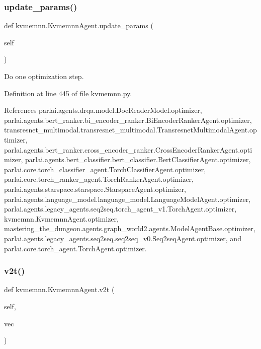\subsubsection{\texorpdfstring{update\+\_\+params()}{update\_params()}}
{\footnotesize\ttfamily def kvmemnn.\+Kvmemnn\+Agent.\+update\+\_\+params (\begin{DoxyParamCaption}\item[{}]{self }\end{DoxyParamCaption})}

\begin{DoxyVerb}Do one optimization step.\end{DoxyVerb}
 

Definition at line 445 of file kvmemnn.\+py.



References parlai.\+agents.\+drqa.\+model.\+Doc\+Reader\+Model.\+optimizer, parlai.\+agents.\+bert\+\_\+ranker.\+bi\+\_\+encoder\+\_\+ranker.\+Bi\+Encoder\+Ranker\+Agent.\+optimizer, transresnet\+\_\+multimodal.\+transresnet\+\_\+multimodal.\+Transresnet\+Multimodal\+Agent.\+optimizer, parlai.\+agents.\+bert\+\_\+ranker.\+cross\+\_\+encoder\+\_\+ranker.\+Cross\+Encoder\+Ranker\+Agent.\+optimizer, parlai.\+agents.\+bert\+\_\+classifier.\+bert\+\_\+classifier.\+Bert\+Classifier\+Agent.\+optimizer, parlai.\+core.\+torch\+\_\+classifier\+\_\+agent.\+Torch\+Classifier\+Agent.\+optimizer, parlai.\+core.\+torch\+\_\+ranker\+\_\+agent.\+Torch\+Ranker\+Agent.\+optimizer, parlai.\+agents.\+starspace.\+starspace.\+Starspace\+Agent.\+optimizer, parlai.\+agents.\+language\+\_\+model.\+language\+\_\+model.\+Language\+Model\+Agent.\+optimizer, parlai.\+agents.\+legacy\+\_\+agents.\+seq2seq.\+torch\+\_\+agent\+\_\+v1.\+Torch\+Agent.\+optimizer, kvmemnn.\+Kvmemnn\+Agent.\+optimizer, mastering\+\_\+the\+\_\+dungeon.\+agents.\+graph\+\_\+world2.\+agents.\+Model\+Agent\+Base.\+optimizer, parlai.\+agents.\+legacy\+\_\+agents.\+seq2seq.\+seq2seq\+\_\+v0.\+Seq2seq\+Agent.\+optimizer, and parlai.\+core.\+torch\+\_\+agent.\+Torch\+Agent.\+optimizer.

\mbox{\label{classkvmemnn_1_1KvmemnnAgent_a781d63f517c888a8e64fedebed676d2b}} 
\subsubsection{\texorpdfstring{v2t()}{v2t()}}
{\footnotesize\ttfamily def kvmemnn.\+Kvmemnn\+Agent.\+v2t (\begin{DoxyParamCaption}\item[{}]{self,  }\item[{}]{vec }\end{DoxyParamCaption})}


